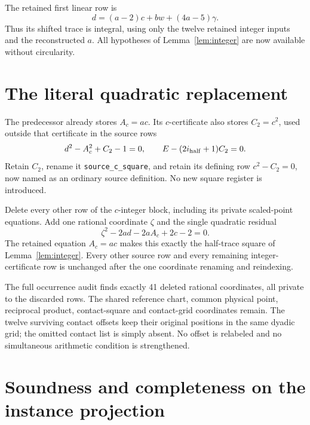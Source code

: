 \documentclass[10pt]{article}
\begin{document}
The retained first linear row is
\[
                d=(a-2)c+bw+(4a-5)\gamma.
\]
Thus its shifted trace is integral, using only the twelve retained
integer inputs and the reconstructed \(a\). All hypotheses of
Lemma~\ref{lem:integer} are now available without circularity.

\section{The literal quadratic replacement}

The predecessor already stores \(A_c=ac\). Its \(c\)-certificate
also stores \(C_2=c^2\), used outside that certificate in the source
rows
\[
             d^2-A_c^2+C_2-1=0,\qquad
             E-(2i_{\rm half}+1)C_2=0.
\]
Retain \(C_2\), rename it \texttt{source\_c\_square}, and retain
its defining row \(c^2-C_2=0\), now named as an ordinary source
definition. No new square register is introduced.

Delete every other row of the \(c\)-integer block, including its
private scaled-point equations. Add one rational coordinate \(\zeta\)
and the single quadratic residual
\begin{equation}\label{eq:new}
                     \zeta^2-2ad-2aA_c+2c-2=0.
\end{equation}
The retained equation \(A_c=ac\) makes this exactly the half-trace
square of Lemma~\ref{lem:integer}. Every other source row and every
remaining integer-certificate row is unchanged after the one coordinate
renaming and reindexing.

The full occurrence audit finds exactly 41 deleted rational coordinates,
all private to the discarded rows. The shared reference chart, common
physical point, reciprocal product, contact-square and contact-grid
coordinates remain. The twelve surviving contact offsets keep their
original positions in the same dyadic grid; the omitted contact list
is simply absent. No offset is relabeled and no simultaneous arithmetic
condition is strengthened.

\section{Soundness and completeness on the instance projection}
\end{document}
